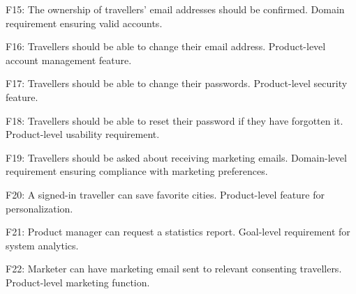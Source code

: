 F15: The ownership of travellers' email addresses should be confirmed.
    Domain requirement ensuring valid accounts.

F16: Travellers should be able to change their email address.
    Product-level account management feature.

F17: Travellers should be able to change their passwords.
    Product-level security feature.

F18: Travellers should be able to reset their password if they have forgotten it.
    Product-level usability requirement.

F19: Travellers should be asked about receiving marketing emails.
    Domain-level requirement ensuring compliance with marketing preferences.

F20: A signed-in traveller can save favorite cities.
    Product-level feature for personalization.

F21: Product manager can request a statistics report.
    Goal-level requirement for system analytics.

F22: Marketer can have marketing email sent to relevant consenting travellers.
    Product-level marketing function.

